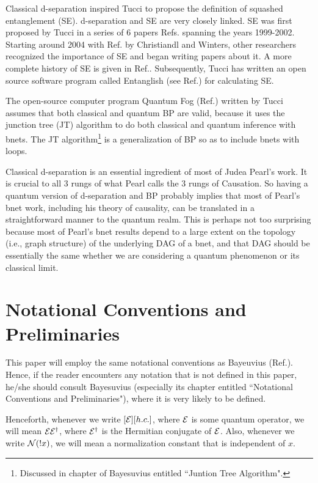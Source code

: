 \documentclass[12pt]{article}
\begin{document}
Classical d-separation inspired
Tucci to propose the definition
of squashed entanglement (SE).
d-separation and SE
are very closely linked. 
SE
was first proposed  by Tucci
in a series of 6 papers 
Refs.\cite{ent1, ent2, ent3, ent4, ent5, ent6}
spanning the years 1999-2002.
Starting around 2004 with
Ref.\cite{putrid-squash} by Christiandl and Winters,
other researchers 
recognized the importance of SE
and began writing papers about it.
A more complete history of SE
is given in Ref.\cite{wiki-sq-ent}.
Subsequently, Tucci has written an open source software
program 
called Entanglish (see Ref.\cite{entanglish}) for 
calculating SE.

The open-source computer program
 Quantum Fog (Ref.\cite{qfog})
written by Tucci assumes that
both classical and quantum BP
 are valid, because
it uses the 
junction tree (JT) algorithm  
to do both classical
and quantum inference with bnets.
The JT
algorithm\footnote{Discussed 
in chapter of Bayesuvius entitled 
``Juntion Tree Algorithm".}
is a generalization of BP so as to 
include bnets with loops.

Classical d-separation
is 
an essential ingredient of most of Judea Pearl's 
work. It 
is crucial
to all 3 rungs of 
what Pearl calls the 3 rungs
of Causation.
So having a quantum version
of d-separation
and BP
probably 
implies
that most of Pearl's
bnet
work, 
including
his theory of
causality, 
can be translated
in a straightforward 
manner to
the quantum realm.
This
is perhaps not too surprising
because most
of Pearl's bnet 
results depend to
a large extent
on the topology (i.e., graph
structure) of the underlying
DAG of a bnet, and that DAG 
should be essentially
the same whether we are
considering a quantum
phenomenon or
its classical limit.






\section{Notational Conventions
 and Preliminaries}
This paper
will employ the same
notational
conventions as
Bayeuvius (Ref.\cite{bayesuvius}).
Hence, if
the reader encounters
any notation that
is not defined
in this paper,
he/she should consult Bayesuvius (especially
its chapter
entitled ``Notational Conventions and Preliminaries"),
where it is very likely
to be defined.

Henceforth,
whenever
we write
$[{\cal E}][h.c.]$,
where ${\cal E}$
is some quantum operator,
we will mean ${\cal E}{\cal E}^\dag$,
where ${\cal E}^\dag$
is the Hermitian conjugate
of ${\cal E}$.
Also, whenever
we write
${\cal N}(!x)$,
we will
mean a 
normalization
constant that is independent
of $x$.
\end{document}
